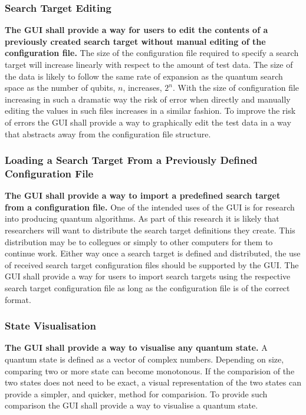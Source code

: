 \subsubsection{Search Target Editing}
\textbf{The GUI shall provide a way for users to edit the contents of a previously created search target without manual editing of the configuration file.}
The size of the configuration file required to specify a search target will increase linearly with respect to the amount of test data.
The size of the data is likely to follow the same rate of expansion as the quantum search space as the number of qubits, $n$, increases, $2^n$.
With the size of configuration file increasing in such a dramatic way the risk of error when directly and manually editing the values in such files increases in a similar fashion.
To improve the risk of errors the GUI shall provide a way to graphically edit the test data in a way that abstracts away from the configuration file structure.

\subsubsection{Loading a Search Target From a Previously Defined Configuration File}
\textbf{The GUI shall provide a way to import a predefined search target from a configuration file.}
One of the intended uses of the GUI is for research into producing quantum algorithms.
As part of this research it is likely that researchers will want to distribute the search target definitions they create.
This distribution may be to collegues or simply to other computers for them to continue work.
Either way once a search target is defined and distributed, the use of received search target configuration files should be supported by the GUI.
The GUI shall provide a way for users to import search targets using the respective search target configuration file as long as the configuration file is of the correct format.

\subsubsection{State Visualisation}
\textbf{The GUI shall provide a way to visualise any quantum state.}
A quantum state is defined as a vector of complex numbers.
Depending on size, comparing two or more state can become monotonous.
If the comparision of the two states does not need to be exact, a visual representation of the two states can provide a simpler, and quicker, method for comparision.
To provide such comparison the GUI shall provide a way to visualise a quantum state.

